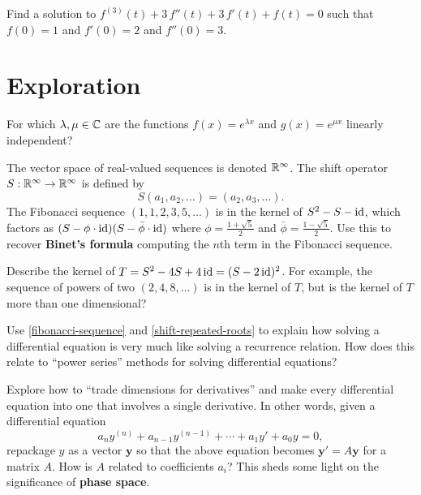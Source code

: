 \documentclass{homework}
\begin{document}
\begin{problem}
  Find a solution to $f^{(3)}(t) + 3 \, f''(t) + 3 \, f'(t) + f(t) = 0$ such that $f(0) = 1$ and $f'(0) = 2$ and $f''(0) = 3$.
\end{problem}

\section{Exploration}

\begin{problem}\label{independent-exponentials}For which $\lambda, \mu \in \mathbb{C}$ are the functions $f(x) = e^{\lambda x}$ and $g(x) = e^{\mu x}$ linearly independent?
\end{problem}

\begin{problem}\label{fibonacci-sequence}The vector space of real-valued sequences is denoted $\mathbb{R}^\infty$.
  The shift operator $S : \mathbb{R}^\infty \to \mathbb{R}^\infty$ is defined by
  \[
    S(a_1,a_2,\ldots) = (a_2,a_3,\ldots).
  \]
  The Fibonacci sequence $(1,1,2,3,5,\ldots)$ is in the kernel of $S^2 - S - \operatorname{id}$, which factors as $(S- \phi \cdot \operatorname{id})(S - \bar{\phi} \cdot \operatorname{id})$ where $\phi = \frac{1+\sqrt{5}}{2}$ and $\bar{\phi} = \frac{1-\sqrt{5}}{2}$.  Use this to recover \textbf{Binet's formula} computing the $n$th term in the Fibonacci sequence.  
\end{problem}

\begin{problem}\label{shift-repeated-roots}Describe the kernel of $T = S^2 - 4S + 4\operatorname{id} = (S-2\operatorname{id})^2$.  For
  example, the sequence of powers of two $(2,4,8,\ldots)$ is in the
  kernel of $T$, but is the kernel of $T$ more than one dimensional?
\end{problem}

\begin{problem}\label{recurrence-differential-analogy}Use \ref{fibonacci-sequence} and \ref{shift-repeated-roots} to
  explain how solving a differential equation is very much like
  solving a recurrence relation.  How does this relate to ``power
  series'' methods for solving differential equations?
\end{problem}

\begin{problem}\label{introduction-phase-space}Explore how to ``trade dimensions for derivatives'' and make every differential equation into one that involves a single derivative.  In other words, given a differential equation
  \[
    a_n y^{(n)} + a_{n-1} y^{(n-1)} + \cdots + a_1 y' + a_0 y  = 0,
  \]
  repackage $y$ as a vector $\textbf{y}$ so that the above equation becomes $\textbf{y}' = A \textbf{y}$ for a matrix $A$.  How is $A$ related to coefficients $a_i$?  This sheds some light on the significance of \textbf{phase space}.
\end{problem}
\end{document}
